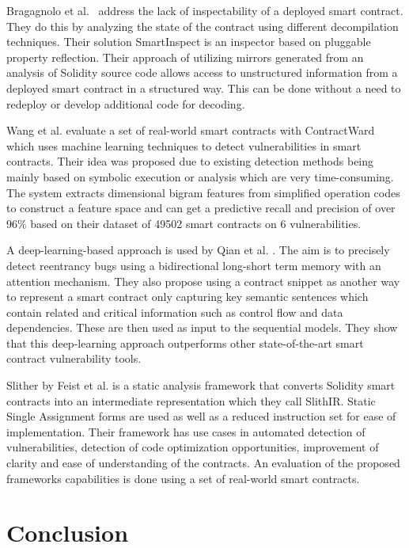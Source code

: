 \documentclass[10pt,conference]{IEEEtran}
\begin{document}
Bragagnolo et al.~\cite{rocha} address the lack of inspectability of a deployed smart contract. They do this by analyzing the state of the contract using different decompilation techniques. Their solution SmartInspect is an inspector based on pluggable property reflection. Their approach of utilizing mirrors generated from an analysis of Solidity source code allows access to unstructured information from a deployed smart contract in a structured way. This can be done without a need to redeploy or develop additional code for decoding.

Wang et al. \cite{contractward} evaluate a set of real-world smart contracts with ContractWard which uses machine learning techniques to detect vulnerabilities in smart contracts. Their idea was proposed due to existing detection methods being mainly based on symbolic execution or analysis which are very time-consuming. The system extracts dimensional bigram features from simplified operation codes to construct a feature space and can get a predictive recall and precision of over 96\% based on their dataset of 49502 smart contracts on 6 vulnerabilities.

A deep-learning-based approach is used by Qian et al. \cite{automated}. The aim is to precisely detect reentrancy bugs using a bidirectional long-short term memory with an attention mechanism. They also propose using a contract snippet as another way to represent a smart contract only capturing key semantic sentences which contain related and critical information such as control flow and data dependencies. These are then used as input to the sequential models. They show that this deep-learning approach outperforms other state-of-the-art smart contract vulnerability tools.

Slither by Feist et al. \cite{slither} is a static analysis framework that converts Solidity smart contracts into an intermediate representation which they call SlithIR. Static Single Assignment forms are used as well as a reduced instruction set for ease of implementation. Their framework has use cases in automated detection of vulnerabilities, detection of code optimization opportunities, improvement of clarity and ease of understanding of the contracts. An evaluation of the proposed frameworks capabilities is done using a set of real-world smart contracts. 

\section{Conclusion}\label{sec:conclusion}
\end{document}
